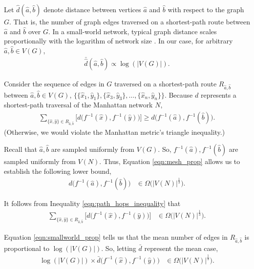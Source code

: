 Let $\hat{d}(\hat{a},\hat{b})$ denote distance between vertices $\hat{a}$ and $\hat{b}$ with respect to the graph $G$.
That is, the number of graph edges traversed on a shortest-path route between $\hat{a}$ and $\hat{b}$ over $G$.
In a small-world network, typical graph distance scales proportionally with the logarithm of network size \citep{watts1998collective}.
In our case, for arbitrary $\hat{a},\hat{b} \in V(G)$,
\begin{align} \label{eqn:smallworld_prop}
\bar{\hat{d}}(\hat{a},\hat{b}) \propto \log(|V(G)|).
\end{align}

Consider the sequence of edges in $G$ traversed on a shortest-path route $R_{\hat{a},\hat{b}}$ between $\hat{a}, \hat{b} \in V(G)$, $\{\{\hat{x}_1, \hat{y}_1\}, \{\hat{x}_3, \hat{y}_3\}, \ldots, \{\hat{x}_n, \hat{y}_n\} \}$.
Because $d$ represents a shortest-path traversal of the Manhattan network $N$,
\begin{align} \label{eqn:path_hops_inequality}
\sum_{\{\hat{x}, \hat{y}\} \in  R_{\hat{a},\hat{b}}}
\Big[ d\Big(f^{-1}(\hat{x}), f^{-1}(\hat{y})\Big) \Big]
\geq
d\Big(f^{-1}(\hat{a}), f^{-1}(\hat{b})\Big).
\end{align}
(Otherwise, we would violate the Manhattan metric's triangle inequality.)

Recall that $\hat{a},\hat{b}$ are sampled uniformly from $V(G)$.
So, $f^{-1}(\hat{a}),f^{-1}(\hat{b})$ are sampled uniformly from $V(N)$.
Thus, Equation \ref{eqn:mesh_prop} allows us to establish the following lower bound,
\begin{align} \label{eqn:path_hops_inequality}
d\Big(f^{-1}(\hat{a}), f^{-1}(\hat{b})\Big)
&\in
\Omega \Big(
  |V(N)|^{\frac{1}{3}}
\Big).
\end{align}

It follows from Inequality \ref{eqn:path_hops_inequality} that
\begin{align*}
\sum_{\{\hat{x}, \hat{y}\} \in  R_{\hat{a},\hat{b}}}
\Big[ d\Big(f^{-1}(\hat{x}), f^{-1}(\hat{y})\Big) \Big]
&\in
\Omega \Big(
  |V(N)|^{\frac{1}{3}}
\Big).
\end{align*}

Equation \ref{eqn:smallworld_prop} tells us that the mean number of edges in $R_{\hat{a}, \hat{b}}$ is proportional to $\log(|V(G)|)$.
So, letting $\bar{d}$ represent the mean case,
\begin{align*}
\log(|V(G)|) \times \bar{d}\Big(f^{-1}(\hat{x}), f^{-1}(\hat{y})\Big)
&\in
\Omega \Big(
  |V(N)|^{\frac{1}{3}}
\Big).
\end{align*}

